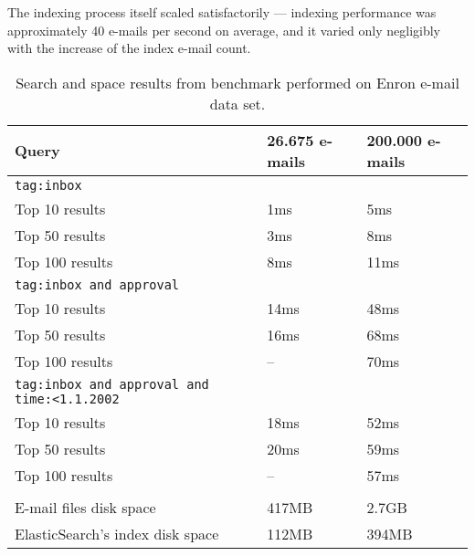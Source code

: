 The indexing process itself scaled satisfactorily --- indexing performance was approximately 40 e-mails per second on average, and it varied only negligibly with the increase of the index e-mail count.
\begin{table}[t]
\centering
\renewcommand{\arraystretch}{1.4}
\begin{tabular}{p{10em} l l}
 \toprule
Query & 26.675 e-mails & 200.000 e-mails\\
\midrule
\texttt{tag:inbox} & &\\
\hline
Top 10 results & 1ms & 5ms\\
Top 50 results & 3ms & 8ms\\
Top 100 results & 8ms & 11ms\\
\hline
\texttt{tag:inbox and approval}  & &\\
\hline
Top 10 results & 14ms & 48ms\\
Top 50 results & 16ms & 68ms\\
Top 100 results & -- & 70ms\\
\hline
\texttt{tag:inbox and approval and time:<1.1.2002}  & &\\
\hline
Top 10 results & 18ms & 52ms\\
Top 50 results & 20ms & 59ms\\
Top 100 results & -- & 57ms\\
\hline
 & &\\
\hline
E-mail files disk space & 417MB & 2.7GB\\
ElasticSearch's index disk space & 112MB & 394MB\\
\bottomrule
\end{tabular}
\caption{Search and space results from benchmark performed on Enron e-mail data set.}
\label{table:bench}
\end{table}